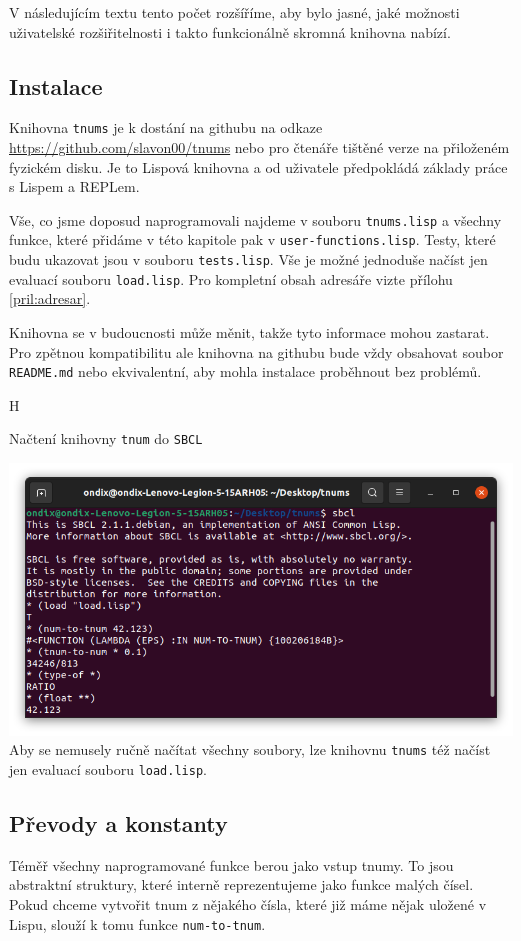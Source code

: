 V následujícím textu tento počet rozšíříme, aby bylo jasné, jaké možnosti uživatelské rozšiřitelnosti i takto funkcionálně skromná knihovna nabízí.

\subsection{Instalace}
Knihovna \texttt{tnums} je k dostání na githubu na odkaze \url{https://github.com/slavon00/tnums} nebo pro čtenáře tištěné verze na přiloženém fyzickém disku. Je to Lispová knihovna a od uživatele předpokládá základy práce s Lispem a REPLem.

Vše, co jsme doposud naprogramovali najdeme v souboru \texttt{tnums.lisp} a všechny funkce, které přidáme v této kapitole pak v \texttt{user-functions.lisp}. Testy, které budu ukazovat jsou v souboru \texttt{tests.lisp}. Vše je možné jednoduše načíst jen evaluací souboru \texttt{load.lisp}. Pro kompletní obsah adresáře vizte přílohu \ref{pril:adresar}.

Knihovna se v budoucnosti může měnit, takže tyto informace mohou zastarat. Pro zpětnou kompatibilitu ale knihovna na githubu bude vždy obsahovat soubor \texttt{README.md} nebo ekvivalentní, aby mohla instalace proběhnout bez problémů.

\begin{myfigure}{H}
\caption{Načtení knihovny \texttt{tnum} do \texttt{SBCL}}
\includegraphics[width=\linewidth]{./graphics/loading.png}\label{obr:loading}
Aby se nemusely ručně načítat všechny soubory, lze knihovnu \texttt{tnums} též načíst jen evaluací souboru \texttt{load.lisp}. 
\end{myfigure}

\subsection{Převody a konstanty}
Téměř všechny naprogramované funkce berou jako vstup tnumy. To jsou abstraktní struktury, které interně reprezentujeme jako funkce malých čísel. Pokud chceme vytvořit tnum z nějakého čísla, které již máme nějak uložené v Lispu, slouží k tomu funkce \texttt{num-to-tnum}.

